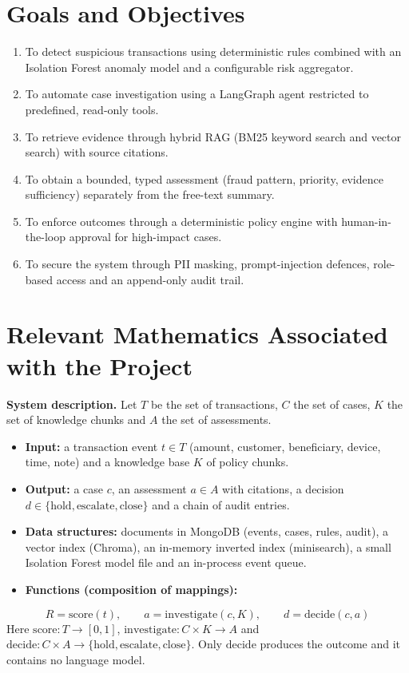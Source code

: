 \documentclass[oneside,a4paper,12pt]{report}
\begin{document}
\section{Goals and Objectives}
\begin{enumerate}
  \item To detect suspicious transactions using deterministic rules combined with an Isolation Forest anomaly model and a configurable risk aggregator.
  \item To automate case investigation using a LangGraph agent restricted to predefined, read-only tools.
  \item To retrieve evidence through hybrid RAG (BM25 keyword search and vector search) with source citations.
  \item To obtain a bounded, typed assessment (fraud pattern, priority, evidence sufficiency) separately from the free-text summary.
  \item To enforce outcomes through a deterministic policy engine with human-in-the-loop approval for high-impact cases.
  \item To secure the system through PII masking, prompt-injection defences, role-based access and an append-only audit trail.
\end{enumerate}

\section{Relevant Mathematics Associated with the Project}
\label{sec:math}
\textbf{System description.}
Let $T$ be the set of transactions, $C$ the set of cases, $K$ the set of knowledge chunks and $A$ the set of assessments.
\begin{itemize}[leftmargin=*]
  \item \textbf{Input:} a transaction event $t \in T$ (amount, customer, beneficiary, device, time, note) and a knowledge base $K$ of policy chunks.
  \item \textbf{Output:} a case $c$, an assessment $a \in A$ with citations, a decision $d \in \{\text{hold},\text{escalate},\text{close}\}$ and a chain of audit entries.
  \item \textbf{Data structures:} documents in MongoDB (events, cases, rules, audit), a vector index (Chroma), an in-memory inverted index (minisearch), a small Isolation Forest model file and an in-process event queue.
  \item \textbf{Functions (composition of mappings):}
\end{itemize}
\begin{equation}
  R = \mathrm{score}(t), \qquad a = \mathrm{investigate}(c, K), \qquad d = \mathrm{decide}(c, a)
\end{equation}
Here $\mathrm{score}: T \to [0,1]$, $\mathrm{investigate}: C \times K \to A$ and $\mathrm{decide}: C \times A \to \{\text{hold},\text{escalate},\text{close}\}$. Only $\mathrm{decide}$ produces the outcome and it contains no language model.
\end{document}
